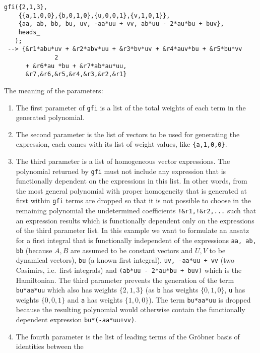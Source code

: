 \documentclass[12pt]{article}
\begin{document}
\begin{description}
\begin{verbatim}
gfi({2,1,3},
    {{a,1,0,0},{b,0,1,0},{u,0,0,1},{v,1,0,1}},
    {aa, ab, bb, bu, uv, -aa*uu + vv, ab*uu - 2*au*bu + buv},
    heads_
   );
 --> {&r1*abu*uv + &r2*abv*uu + &r3*bv*uv + &r4*auv*bu + &r5*bu*vv
              2
      + &r6*au *bu + &r7*ab*au*uu,
      &r7,&r6,&r5,&r4,&r3,&r2,&r1} \end{verbatim}
  The meaning of the parameters:
        \begin{enumerate}
          \item The first parameter of {\tt gfi} is a list of the
                total weights of each term in the generated polynomial.
          \item The second parameter is the list of vectors to be used
                for generating the expression, each comes
                with its list of weight values, like {\tt \{a,1,0,0\}}.
          \item The third parameter is a list of homogeneous vector
                expressions. The polynomial returned by {\tt gfi} must
                not include any expression that is functionally
                dependent on the expressions in this list. In other
                words, from the most general polynomial with proper
                homogeneity that is generated at first within {\tt gfi}
                terms are
                dropped so that it is not possible to choose in the
                remaining polynomial the undetermined coefficients
                {\tt !\&r1,!\&r2,...} such that an expression results
                which is functionally dependent only on the
                expressions of the third parameter list.  In this
                example we want to formulate an ansatz for a first
                integral that is functionally independent of the
                expressions
{\tt aa, ab, bb} (because $A,B$ are assumed to be constant vectors and
$U,V$ to be dynamical vectors), {\tt bu} (a known first integral),
{\tt uv, -aa*uu + vv} (two Casimirs, i.e.\ first integrals) and
{\tt (ab*uu - 2*au*bu + buv)} which is the Hamiltonian.  The third parameter
prevents the generation of the term {\tt bu*aa*uu} which also has weights
$\{2,1,3\}$ (as {\tt b} has weights $\{0,1,0\}$, {\tt u} has weights
$\{0,0,1\}$ and {\tt a} has weights $\{1,0,0\}$). The term {\tt bu*aa*uu}
is dropped because the resulting polynomial would otherwise contain the
functionally dependent expression {\tt bu*(-aa*uu+vv)}.
          \item The fourth parameter is the list of leading terms of
                the Gr\"{o}bner basis of identities between the

\end{enumerate}
\end{description}
\end{document}
